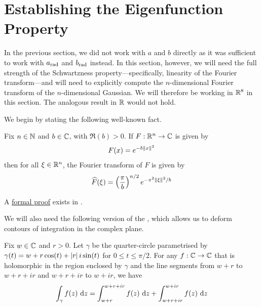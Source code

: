 \section{Establishing the Eigenfunction Property}
\label{Ch4:Sec:Eig}


In the previous section, we did not work with $a$ and $b$ directly as it was sufficient to work with $a_{\operatorname{rad}}$ and $b_{\operatorname{rad}}$ instead. In this section, however, we will need the full strength of the Schwartzness property---specifically, linearity of the Fourier transform---and will need to explicitly compute the $n$-dimensional Fourier transform of the $n$-dimensional Gaussian. We will therefore be working in $\mathbb{R}^8$ in this section. The analogous result in $\mathbb{R}$ would not hold.

We begin by stating the following well-known fact.
\begin{boxtheorem}\label{Ch4:Thm:GaussianFourier}
    Fix $n \in \mathbb{N}$ and $b \in \mathbb{C}$, with $\Re(b) > 0$. If $F : \mathbb{R}^n \to \mathbb{C}$ is given by
    \begin{align*}
        F(x) = e^{-b \left\lVert x \right\rVert^2}
    \end{align*}
    then for all $\xi \in \mathbb{R}^n$, the Fourier transform of $F$ is given by
    \begin{align*}
        \widehat{F}\!\left( \xi \right) = \left( \frac{\pi}{b} \right)^{{n} / {2}} e^{{- \pi^2 \left\lVert \xi \right\rVert^2} / {b}}
    \end{align*}
\end{boxtheorem}
A \href{https://github.com/leanprover-community/mathlib4/blob/5a2eaa85c555c4263e15928cef249cbaad2eb2d2/Mathlib/Analysis/SpecialFunctions/Gaussian/FourierTransform.lean#L360-L363}{formal proof} exists in \mathlib.

We will also need the following version of the \CGT, which allows us to deform contours of integration in the complex plane.

\begin{boxtheorem}\label{Ch4:Thm:CGTRectCircle}
    Fix $w \in \mathbb{C}$ and $r > 0$. Let $\gamma$ be the quarter-circle parametrised by $\gamma(t) = w + r\cos\!{\left( t \right)} + \left\lvert r \right\rvert i \sin\!{\left( t \right)}$ for $0 \leq t \leq \pi/2$. For any $f : \mathbb{C} \to \mathbb{C}$ that is holomorphic in the region enclosed by $\gamma$ and the line segments from $w + r$ to $w + r + ir$ and $w + r + ir$ to $w + ir$, we have
    \begin{align*}
        \int_{\gamma} f(z) \, \operatorname{d}\!{z}
        = \int_{w + r}^{w + r + ir} f(z) \, \operatorname{d}\!{z} + \int_{w + r + ir}^{w + ir} f(z) \, \operatorname{d}\!{z}
    \end{align*}
\end{boxtheorem}

